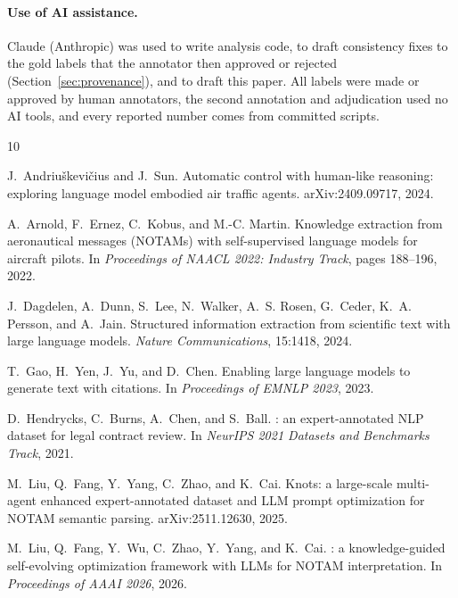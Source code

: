 \documentclass[11pt,a4paper]{article}
\begin{document}
\paragraph{Use of AI assistance.} Claude (Anthropic) was used to write analysis code, to draft consistency fixes to the gold labels that the annotator then approved or rejected (Section~\ref{sec:provenance}), and to draft this paper. All labels were made or approved by human annotators, the second annotation and adjudication used no AI tools, and every reported number comes from committed scripts.

\begin{thebibliography}{10}
\providecommand{\natexlab}[1]{#1}

J.~Andriu{\v{s}}kevi{\v{c}}ius and J.~Sun.
\newblock Automatic control with human-like reasoning: exploring language model embodied air traffic agents.
\newblock arXiv:2409.09717, 2024.

A.~Arnold, F.~Ernez, C.~Kobus, and M.-C. Martin.
\newblock Knowledge extraction from aeronautical messages ({NOTAMs}) with self-supervised language models for aircraft pilots.
\newblock In \emph{Proceedings of NAACL 2022: Industry Track}, pages 188--196, 2022.

J.~Dagdelen, A.~Dunn, S.~Lee, N.~Walker, A.~S. Rosen, G.~Ceder, K.~A. Persson, and A.~Jain.
\newblock Structured information extraction from scientific text with large language models.
\newblock \emph{Nature Communications}, 15:1418, 2024.

T.~Gao, H.~Yen, J.~Yu, and D.~Chen.
\newblock Enabling large language models to generate text with citations.
\newblock In \emph{Proceedings of EMNLP 2023}, 2023.

D.~Hendrycks, C.~Burns, A.~Chen, and S.~Ball.
: an expert-annotated {NLP} dataset for legal contract review.
\newblock In \emph{NeurIPS 2021 Datasets and Benchmarks Track}, 2021.

M.~Liu, Q.~Fang, Y.~Yang, C.~Zhao, and K.~Cai.
\newblock Knots: a large-scale multi-agent enhanced expert-annotated dataset and {LLM} prompt optimization for {NOTAM} semantic parsing.
\newblock arXiv:2511.12630, 2025.

M.~Liu, Q.~Fang, Y.~Wu, C.~Zhao, Y.~Yang, and K.~Cai.
: a knowledge-guided self-evolving optimization framework with {LLMs} for {NOTAM} interpretation.
\newblock In \emph{Proceedings of AAAI 2026}, 2026.


\end{thebibliography}
\end{document}
